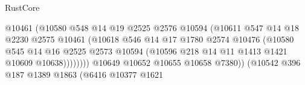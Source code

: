 \begin{lexlean}{RustCore}
\begin{coremodule}
                                            @10461
                                            (@10580
                                              @548
                                              @14
                                              @19
                                              @2525
                                              @2576
                                              @10594
                                              (@10611
                                                @547
                                                @14
                                                @18
                                                @2230
                                                @2575
                                                @10461
                                                (@10618
                                                  @546
                                                  @14
                                                  @17
                                                  @1780
                                                  @2574
                                                  @10476
                                                  (@10580
                                                    @545
                                                    @14
                                                    @16
                                                    @2525
                                                    @2573
                                                    @10594
                                                    (@10596
                                                      @218
                                                      @14
                                                      @11
                                                      @1413
                                                      @1421
                                                      @10609
                                                      @10638))))))))
                                      @10649
                                      @10652
                                      @10655
                                      @10658
                                      @7380))
                                  (@10542
                                    @396
                                    @187
                                    @1389
                                    @1863
                                    (@6416
                                      @10377
                                      @1621

\end{coremodule}
\end{lexlean}
